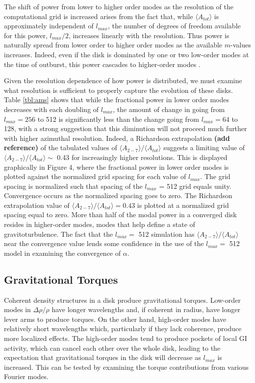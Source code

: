 \documentclass[manuscript]{aastex} %
\begin{document}
The shift of power from lower to higher order modes as the resolution of the computational grid is increased arises from the fact that, while $\langle A_{tot} \rangle$ is approximately independent of $l_{max}$, the number of degrees of freedom available for this power, $l_{max}/2$, increases linearly with the resolution. Thus power is naturally spread from lower order to higher order modes as the available $m$-values increases. Indeed, even if the disk is dominated by one or two low-order modes at the time of outburst, this power cascades to higher-order modes \citep[for example]{laughlin1997, laughlin1998,laughlin1996}.


Given the resolution dependence of how power is distributed,  we must examine what resolution is sufficient to properly capture the evolution of these disks. Table \ref{tbl:ams} shows that while the fractional power in lower order modes decreases with each doubling of $l_{max}$, the amount of change in going from $l_{max} = 256$ to 512 
is significantly less than the change going from $l_{max} = 64$ to 128, with a strong suggestion that this diminution will not proceed much further with higher azimuthal resolution. Indeed, a  Richardson extrapolation {\bf (add reference)} of the tabulated values of  $\langle A_{2-7} \rangle / \langle A_{tot} \rangle$ suggests a limiting value of  $\langle A_{2-7} \rangle / \langle A_{tot} \rangle \sim$ 0.43 for increasingly higher resolutions. This is displayed graphically in Figure 4, where the fractional power in lower order modes is plotted against the  normalized grid 
spacing for each value of $l_{max}$. The grid spacing  is normalized such that spacing of the $l_{max}$ = 512 grid
equals unity.  Convergence occurs as the normalized spacing goes to zero. The Richardson extrapolation value  of $\langle A_{2-7}\rangle  / \langle A_{tot}\rangle  = 0.43$ is plotted at a normalized grid spacing  equal to zero. More than half of the modal power in a converged disk resides in higher-order modes, modes that help define a state of gravitoturbulence. The fact that the $l_{max} =$ 512 simulation has $\langle A_{2-7} \rangle / \langle A_{tot} \rangle$ near the convergence value lends some confidence in the use of the $l_{max} =$ 512 model in examining the convergence of $\alpha$. 

\subsection{Gravitational Torques}

Coherent density structures in a disk produce gravitational torques. Low-order modes in $\Delta\rho / \rho$  have longer wavelengths and, if coherent in radius, have longer lever arms to produce torques. On the other hand, high-order modes have relatively short wavelengths which, particularly if they lack coherence, produce more localized effects. The high-order modes tend to produce pockets of local GI activity, which can cancel each other
over the whole disk, leading to the expectation that  gravitational torques in the disk will decrease as $l_{max}$ is increased.    This can be tested by examining the torque contributions from  various Fourier modes.
\end{document}
